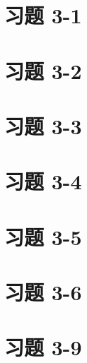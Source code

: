 \documentclass[UTF8,12pt,a4paper]{ctexart} %
\begin{document}
\section*{习题 3-1}



\section*{习题 3-2}



\section*{习题 3-3}



\section*{习题 3-4}



\section*{习题 3-5}



\section*{习题 3-6}



\section*{习题 3-9}


\end{document}
